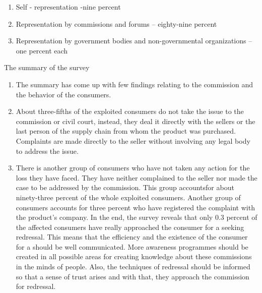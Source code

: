 \begin{multicols}{2}
\vspace{-.3cm}

\begin{enumerate}[label=$\bullet$]
\itemsep=0pt
\item Self - representation -nine percent

\item Representation by commissions and forums – eighty-nine percent

\item Representation by government bodies and non-governmental organizations – one percent each
\end{enumerate}

\vspace{-.3cm}

\noi
The summary of the survey

\vspace{-.3cm}

\begin{enumerate}[label=$\bullet$]
\itemsep=0pt
\item The summary has come up with few findings relating to the commission and the
behavior of the consumers.

\item About three-fifths of the exploited consumers do not take the issue to the commission
or civil court, instead, they deal it directly with the sellers or the last person of the
supply chain from whom the product was purchased. Complaints are made directly to
the seller without involving any legal body to address the issue.

\item There is another group of consumers who have not taken any action for the loss they
have faced. They have neither complained to the seller nor made the case to be
addressed by the commission. This group accountsfor about ninety-three percent of the
whole exploited consumers. Another group of consumers accounts for three percent
who have registered the complaint with the product’s company. In the end, the survey
reveals that only 0.3 percent of the affected consumers have really approached the
consumer for a seeking redressal. This means that the efficiency and the existence of
the consumer for a should be well communicated. More awareness programmes should be created in all possible areas for creating knowledge about these commissions in the
minds of people. Also, the techniques of redressal should be informed so that a sense
of trust arises and with that, they approach the commission for redressal.


\end{enumerate}
\end{multicols}
